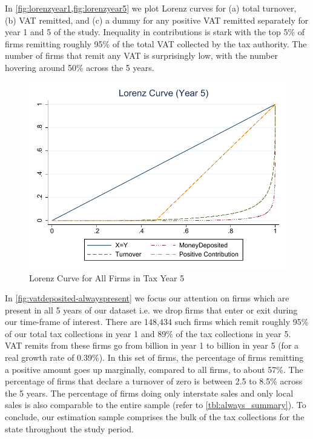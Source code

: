 In \cref{fig:lorenzyear1,fig:lorenzyear5} we plot Lorenz curves for (a) total turnover, (b) VAT remitted, and (c) a dummy for any positive VAT remitted separately for year 1 and 5 of the study. Inequality in contributions is stark with the top 5\% of firms remitting roughly 95\% of the total VAT collected by the tax authority. The number of firms that remit any VAT is surprisingly low, with the number hovering around 50\% across the 5 years.

\begin{figure}[t!]
\scriptsize
\centering
\includegraphics[width=.6\textwidth]{graphs/LorenzCurve_TaxYear5.pdf}
\caption{Lorenz Curve for All Firms in Tax Year 5}
\label{fig:lorenzyear5}
\end{figure}

In \cref{fig:vatdeposited-alwayspresent} we focus our attention on firms which are present in all 5 years of our dataset i.e. we drop firms that enter or exit during our time-frame of interest. There are 148,434 such firms which remit roughly 95\% of our total tax collections in year 1 and 89\% of the tax collections in year 5. VAT remits from these firms go from  billion in year 1 to  billion in year 5 (for a real growth rate of 0.39\%). In this set of firms, the percentage of firms remitting a positive amount goes up marginally, compared to all firms, to about 57\%. The percentage of firms that declare a turnover of zero is between 2.5 to 8.5\% across the 5 years. The percentage of firms doing only interstate sales and only local sales is also comparable to the entire sample (refer to \cref{tbl:always_summary}). To conclude, our estimation sample comprises the bulk of the tax collections for the state throughout the study period. 

